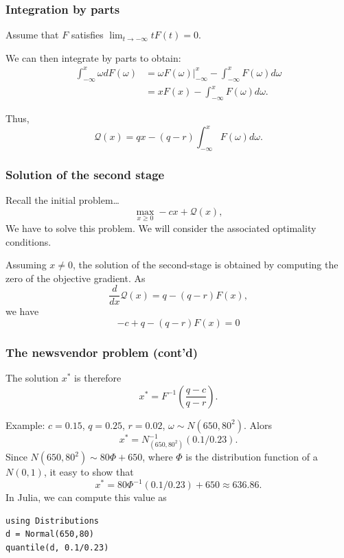\documentclass{beamer}
\begin{document}
\begin{frame}
\frametitle{Integration by parts}

Assume that $F$ satisfies $\lim_{t \rightarrow -\infty}
tF(t) = 0$.

\mbox{}

We can then integrate by parts to obtain:
\begin{align*}
\int_{-\infty}^x \omega dF(\omega) &= \omega F(\omega) |_{-\infty}^x -
\int_{-\infty}^x F(\omega) d\omega \\
&=  xF(x) - \int_{-\infty}^x F(\omega) d\omega.
\end{align*}

Thus,
\[
\mathcal{Q}(x) = qx - (q - r)\int_{-\infty}^x F(\omega)d\omega.
\]

\end{frame}

\begin{frame}
\frametitle{Solution of the second stage}

Recall the initial problem\ldots
\[
\max_{x \geq 0} -cx + \mathcal{Q}(x),
\]
We have to solve this problem.
We will consider the associated optimality conditions.

\mbox{}

Assuming $x \ne 0$, the solution of the second-stage is obtained by computing the zero of the objective gradient.
As
\[
\frac{d}{dx} \mathcal{Q}(x) = q - (q - r)F(x),
\]
we have
\[
-c + q - (q - r)F(x) = 0
\]

\end{frame}

\begin{frame}[fragile]
\frametitle{The newsvendor problem (cont'd)}

The solution $x^*$ is therefore
\[
x^* = F^{-1} \left( \frac{q-c}{q-r} \right).
\]

\mbox{}

Example: $c = 0.15$, $q = 0.25$, $r = 0.02$, $\omega \sim N(650, 80^2)$. Alors
\[
x^* = N^{-1}_{(650,80^2)}(0.1/0.23).
\]
Since $N(650, 80^2) \sim 80\Phi+650$, where $\Phi$ is the distribution function of a $N(0,1)$, it easy to show that
\[
x^* = 80\Phi^{-1}(0.1/0.23) + 650 \approx 636.86.
\]
In Julia, we can compute this value as
\begin{verbatim}
using Distributions
d = Normal(650,80)
quantile(d, 0.1/0.23)
\end{verbatim}


\end{frame}
\end{document}
